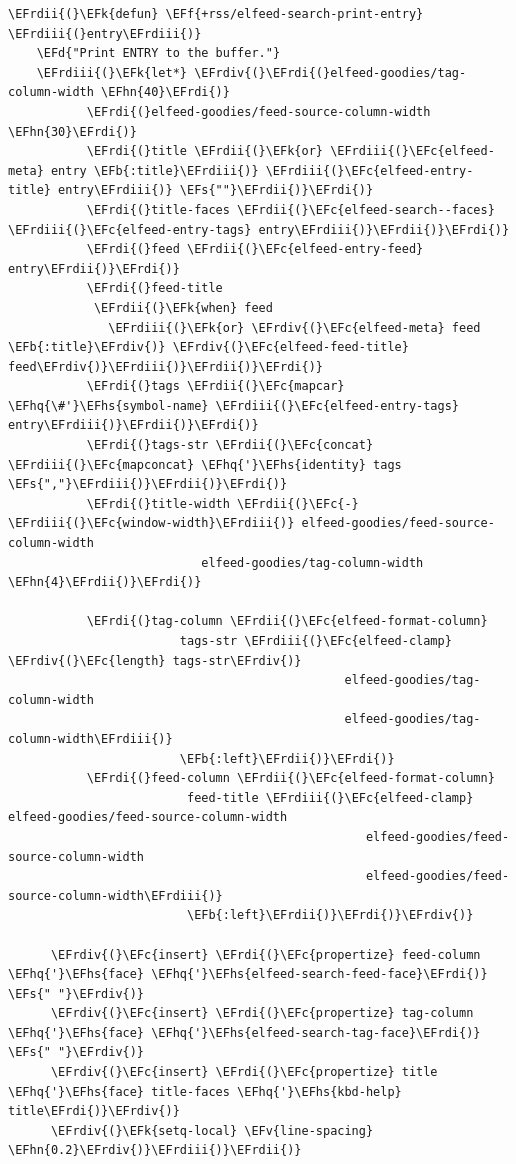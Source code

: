 \documentclass{scrartcl}
\newcommand{\EFk}[1]{\textcolor{EFk}{#1}} %
\newcommand{\EFd}[1]{\textcolor{EFd}{\textit{#1}}} %
\newcommand{\EFs}[1]{\textcolor{EFs}{#1}} %
\newcommand{\EFb}[1]{\textcolor{EFb}{#1}} %
\newcommand{\EFc}[1]{\textcolor{EFc}{#1}} %
\newcommand{\EFv}[1]{\textcolor{EFv}{#1}} %
\newcommand{\EFf}[1]{\textcolor{EFf}{#1}} %
\newcommand{\EFhn}[1]{\textcolor{EFhn}{\textbf{#1}}} %
\newcommand{\EFhq}[1]{\textcolor{EFhq}{#1}} %
\newcommand{\EFhs}[1]{\textcolor{EFhs}{#1}} %
\newcommand{\EFrdi}[1]{\textcolor{EFrdi}{#1}} %
\newcommand{\EFrdii}[1]{\textcolor{EFrdii}{#1}} %
\newcommand{\EFrdiii}[1]{\textcolor{EFrdiii}{#1}} %
\newcommand{\EFrdiv}[1]{\textcolor{EFrdiv}{#1}} %
\begin{document}
\begin{Code}
\begin{Verbatim}[]
  \EFrdii{(}\EFk{defun} \EFf{+rss/elfeed-search-print-entry} \EFrdiii{(}entry\EFrdiii{)}
    \EFd{"Print ENTRY to the buffer."}
    \EFrdiii{(}\EFk{let*} \EFrdiv{(}\EFrdi{(}elfeed-goodies/tag-column-width \EFhn{40}\EFrdi{)}
           \EFrdi{(}elfeed-goodies/feed-source-column-width \EFhn{30}\EFrdi{)}
           \EFrdi{(}title \EFrdii{(}\EFk{or} \EFrdiii{(}\EFc{elfeed-meta} entry \EFb{:title}\EFrdiii{)} \EFrdiii{(}\EFc{elfeed-entry-title} entry\EFrdiii{)} \EFs{""}\EFrdii{)}\EFrdi{)}
           \EFrdi{(}title-faces \EFrdii{(}\EFc{elfeed-search--faces} \EFrdiii{(}\EFc{elfeed-entry-tags} entry\EFrdiii{)}\EFrdii{)}\EFrdi{)}
           \EFrdi{(}feed \EFrdii{(}\EFc{elfeed-entry-feed} entry\EFrdii{)}\EFrdi{)}
           \EFrdi{(}feed-title
            \EFrdii{(}\EFk{when} feed
              \EFrdiii{(}\EFk{or} \EFrdiv{(}\EFc{elfeed-meta} feed \EFb{:title}\EFrdiv{)} \EFrdiv{(}\EFc{elfeed-feed-title} feed\EFrdiv{)}\EFrdiii{)}\EFrdii{)}\EFrdi{)}
           \EFrdi{(}tags \EFrdii{(}\EFc{mapcar} \EFhq{\#'}\EFhs{symbol-name} \EFrdiii{(}\EFc{elfeed-entry-tags} entry\EFrdiii{)}\EFrdii{)}\EFrdi{)}
           \EFrdi{(}tags-str \EFrdii{(}\EFc{concat} \EFrdiii{(}\EFc{mapconcat} \EFhq{'}\EFhs{identity} tags \EFs{","}\EFrdiii{)}\EFrdii{)}\EFrdi{)}
           \EFrdi{(}title-width \EFrdii{(}\EFc{-} \EFrdiii{(}\EFc{window-width}\EFrdiii{)} elfeed-goodies/feed-source-column-width
                           elfeed-goodies/tag-column-width \EFhn{4}\EFrdii{)}\EFrdi{)}

           \EFrdi{(}tag-column \EFrdii{(}\EFc{elfeed-format-column}
                        tags-str \EFrdiii{(}\EFc{elfeed-clamp} \EFrdiv{(}\EFc{length} tags-str\EFrdiv{)}
                                               elfeed-goodies/tag-column-width
                                               elfeed-goodies/tag-column-width\EFrdiii{)}
                        \EFb{:left}\EFrdii{)}\EFrdi{)}
           \EFrdi{(}feed-column \EFrdii{(}\EFc{elfeed-format-column}
                         feed-title \EFrdiii{(}\EFc{elfeed-clamp} elfeed-goodies/feed-source-column-width
                                                  elfeed-goodies/feed-source-column-width
                                                  elfeed-goodies/feed-source-column-width\EFrdiii{)}
                         \EFb{:left}\EFrdii{)}\EFrdi{)}\EFrdiv{)}

      \EFrdiv{(}\EFc{insert} \EFrdi{(}\EFc{propertize} feed-column \EFhq{'}\EFhs{face} \EFhq{'}\EFhs{elfeed-search-feed-face}\EFrdi{)} \EFs{" "}\EFrdiv{)}
      \EFrdiv{(}\EFc{insert} \EFrdi{(}\EFc{propertize} tag-column \EFhq{'}\EFhs{face} \EFhq{'}\EFhs{elfeed-search-tag-face}\EFrdi{)} \EFs{" "}\EFrdiv{)}
      \EFrdiv{(}\EFc{insert} \EFrdi{(}\EFc{propertize} title \EFhq{'}\EFhs{face} title-faces \EFhq{'}\EFhs{kbd-help} title\EFrdi{)}\EFrdiv{)}
      \EFrdiv{(}\EFk{setq-local} \EFv{line-spacing} \EFhn{0.2}\EFrdiv{)}\EFrdiii{)}\EFrdii{)}


\end{Verbatim}
\end{Code}
\end{document}

